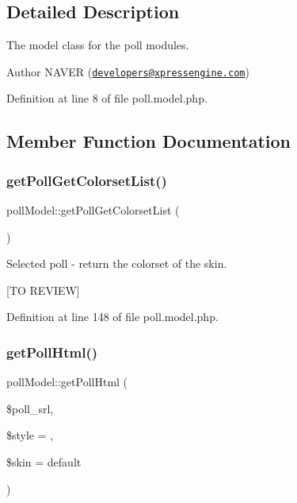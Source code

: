 \subsection{Detailed Description}
The model class for the poll modules. 

\begin{DoxyAuthor}{Author}
N\+A\+V\+ER (\href{mailto:developers@xpressengine.com}{\tt developers@xpressengine.\+com}) 
\end{DoxyAuthor}


Definition at line 8 of file poll.\+model.\+php.



\subsection{Member Function Documentation}
\mbox{\label{classpollModel_a350de71f668751cd553fc60aca3fa72c}} 
\subsubsection{\texorpdfstring{get\+Poll\+Get\+Colorset\+List()}{getPollGetColorsetList()}}
{\footnotesize\ttfamily poll\+Model\+::get\+Poll\+Get\+Colorset\+List (\begin{DoxyParamCaption}{ }\end{DoxyParamCaption})}



Selected poll -\/ return the colorset of the skin. 

\mbox{[}TO R\+E\+V\+I\+EW\mbox{]} 

Definition at line 148 of file poll.\+model.\+php.

\mbox{\label{classpollModel_a75ba9768f206d9467f997beeb8c3e34e}} 
\subsubsection{\texorpdfstring{get\+Poll\+Html()}{getPollHtml()}}
{\footnotesize\ttfamily poll\+Model\+::get\+Poll\+Html (\begin{DoxyParamCaption}\item[{}]{\$poll\+\_\+srl,  }\item[{}]{\$style = {\ttfamily \textquotesingle{}\textquotesingle{}},  }\item[{}]{\$skin = {\ttfamily \textquotesingle{}default\textquotesingle{}} }\end{DoxyParamCaption})}




